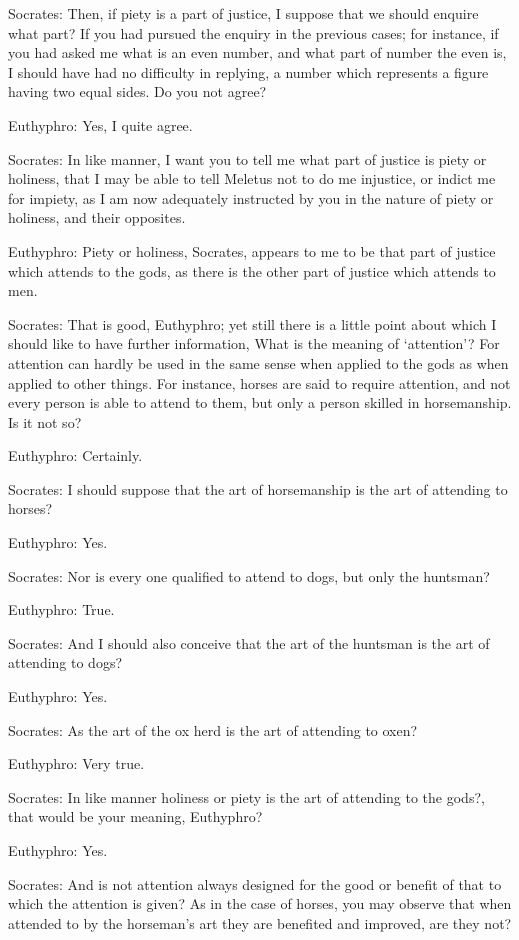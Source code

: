 Socrates: Then, if piety is a part of justice, I suppose that we should enquire what part? If you had pursued the enquiry in the previous cases; for instance, if you had asked me what is an even number, and what part of number the even is, I should have had no difficulty in replying, a number which represents a figure having two equal sides. Do you not agree?

Euthyphro: Yes, I quite agree.

Socrates: In like manner, I want you to tell me what part of justice is piety or holiness, that I may be able to tell Meletus not to do me injustice, or indict me for impiety, as I am now adequately instructed by you in the nature of piety or holiness, and their opposites.

Euthyphro: Piety or holiness, Socrates, appears to me to be that part of justice which attends to the gods, as there is the other part of justice which attends to men.

Socrates: That is good, Euthyphro; yet still there is a little point about which I should like to have further information, What is the meaning of `attention'? For attention can hardly be used in the same sense when applied to the gods as when applied to other things. For instance, horses are said to require attention, and not every person is able to attend to them, but only a person skilled in horsemanship. Is it not so?

Euthyphro: Certainly.

Socrates: I should suppose that the art of horsemanship is the art of attending to horses?

Euthyphro: Yes.

Socrates: Nor is every one qualified to attend to dogs, but only the huntsman?

Euthyphro: True.

Socrates: And I should also conceive that the art of the huntsman is the art of attending to dogs?

Euthyphro: Yes.

Socrates: As the art of the ox herd is the art of attending to oxen?

Euthyphro: Very true.

Socrates: In like manner holiness or piety is the art of attending to the gods?, that would be your meaning, Euthyphro?

Euthyphro: Yes.

Socrates: And is not attention always designed for the good or benefit of that to which the attention is given? As in the case of horses, you may observe that when attended to by the horseman's art they are benefited and improved, are they not?

